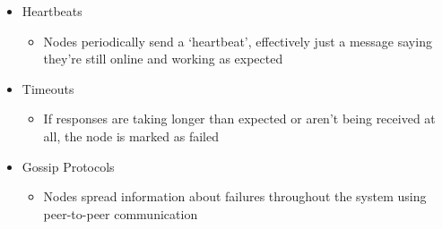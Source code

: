\begin{itemize}
  \item Heartbeats
  \begin{itemize}
    \item Nodes periodically send a `heartbeat', effectively just a message saying they're still online and working as expected
  \end{itemize}
  \item Timeouts
  \begin{itemize}
    \item If responses are taking longer than expected or aren't being received at all, the node is marked as failed
  \end{itemize}
  \item Gossip Protocols
  \begin{itemize}
    \item Nodes spread information about failures throughout the system using peer-to-peer communication
  \end{itemize}
\end{itemize}
